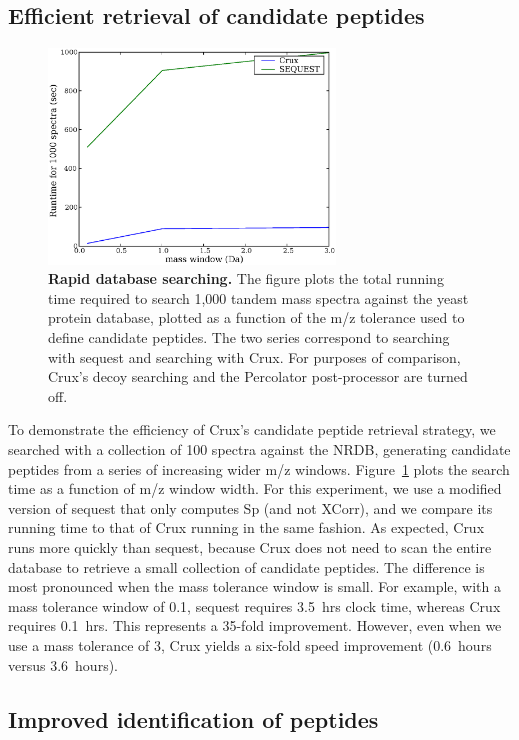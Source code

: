\documentclass{bioinfo}
\begin{document}
\subsection{Efficient retrieval of candidate peptides}

\begin{figure}
  \centering
  \includegraphics[width=3in]{./Images/indexing.eps}
  \caption{{\bf Rapid database searching.}  The figure plots the total
  running time required to search 1,000 tandem mass spectra against
  the yeast protein database, plotted as a function of the m/z
  tolerance used to define candidate peptides.  The two series
  correspond to searching with {\sc sequest} and searching with Crux.  For
  purposes of comparison, Crux's decoy searching and the Percolator
  post-processor are turned off.
  \label{figure:indexing}}
\end{figure}

To demonstrate the efficiency of Crux's candidate peptide retrieval
strategy, we searched with a collection of 100 spectra against the
NRDB, generating candidate peptides from a series of increasing wider
m/z windows.  Figure~\ref{figure:indexing} plots the search time as a
function of m/z window width.  For this experiment, we use a modified
version of {\sc sequest} that only computes Sp (and not XCorr), and we
compare its running time to that of Crux running in the same fashion.
As expected, Crux runs more quickly than {\sc sequest}, because Crux does
not need to scan the entire database to retrieve a small collection of
candidate peptides.  The difference is most pronounced when the mass
tolerance window is small.  For example, with a mass tolerance window
of 0.1, {\sc sequest} requires 3.5~hrs clock time, whereas Crux requires
0.1~hrs.  This represents a 35-fold improvement.  However, even when
we use a mass tolerance of 3, Crux yields a six-fold speed improvement
(0.6~hours versus 3.6~hours).

\subsection{Improved identification of peptides}
\end{document}
